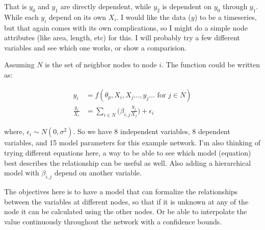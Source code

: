 \documentclass[twoside,12pt,a4paper]{article}
\begin{document}

That is \(y_0\) and \(y_1\) are directly dependent, while \(y_2\) is dependent on \(y_0\) through \(y_1\). While each \(y_i\) depend on its own \(X_i\). I would like the data (\(y\)) to be a timeseries, but that again comes with its own complications, so I might do a simple node attributes (like area, length, etc) for this. I will probably try a few different variables and see which one works, or show a comparision.

Assuming \(N\) is the set of neighbor nodes to node \(i\). The function could be written as:

\begin{align*}
  y_i &= f(\theta_p, X_i, X_j \hdots, y_j \hdots {\text{ for } j \in N})\\
  \frac{y_i}{X_i} &= \sum_{i \in N} \biggl( \beta_{i,j} \frac{y_j}{X_j}\biggr) + \epsilon_i 
\end{align*}

where, \(\epsilon_i \sim N(0, \sigma^2)\). So we have 8 independent variables, 8 dependent variables, and 15 model parameters for this example network. I'm also thinking of trying different equations here, a way to be able to see which model (equation) best describes the relationship can be useful as well. Also adding a hierarchical model with \(\beta_{i,j}\) depend on another variable.

The objectives here is to have a model that can formalize the relationships between the variables at different nodes, so that if it is unknown at any of the node it can be calculated using the other nodes. Or be able to interpolate the value continuously throughout the network with a confidence bounds.
\end{document}
